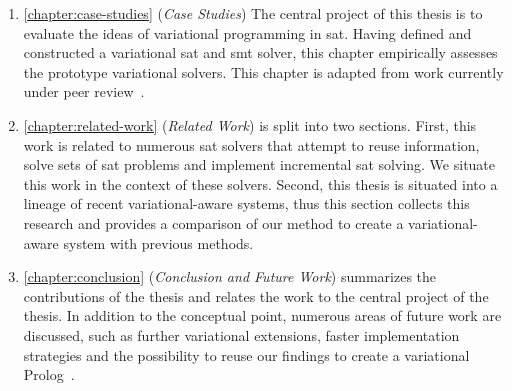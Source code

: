 \begin{enumerate}
  \item \autoref{chapter:case-studies} (\emph{Case Studies}) The central project
    of this thesis is to evaluate the ideas of variational programming in
    \acl{sat}. Having defined and constructed a variational \ac{sat} and
    \ac{smt} solver, this chapter empirically assesses the prototype variational
    solvers. This chapter is adapted from work currently under peer
    review~\cite{VSATJournal}.

  \item \autoref{chapter:related-work} (\emph{Related Work}) is split into two
    sections. First, this work is related to numerous \ac{sat}
    solvers that attempt to reuse information, solve sets of \ac{sat} problems
    and implement incremental \ac{sat} solving. We situate this work in the
    context of these solvers. Second, this thesis is situated into a lineage of recent
    variational-aware systems, thus this section collects this research and
    provides a comparison of our method to create a variational-aware system
    with previous methods.

  \item \autoref{chapter:conclusion} (\emph{Conclusion and Future Work})
    summarizes the contributions of the thesis and relates the work to the
    central project of the thesis. In addition to the conceptual point, numerous
    areas of future work are discussed, such as further variational extensions,
    faster implementation strategies and the possibility to reuse our findings
    to create a variational
    Prolog~\cite{wielemaker:2011:tplp,EarlyLogicProgramming}.
  \end{enumerate}



